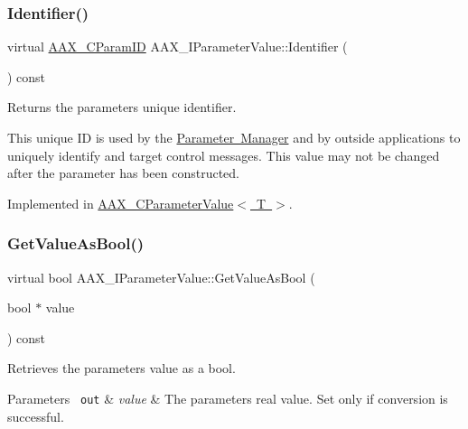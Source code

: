 \mbox{\label{a01853_a5de1e79f1f0e7024f6f473d923b5dda2}} 
\subsubsection{\texorpdfstring{Identifier()}{Identifier()}}
{\footnotesize\ttfamily virtual \mbox{\hyperlink{a00392_a1440c756fe5cb158b78193b2fc1780d1}{A\+A\+X\+\_\+\+C\+Param\+ID}} A\+A\+X\+\_\+\+I\+Parameter\+Value\+::\+Identifier (\begin{DoxyParamCaption}{ }\end{DoxyParamCaption}) const\hspace{0.3cm}{\ttfamily [pure virtual]}}



Returns the parameter\textquotesingle{}s unique identifier. 

This unique ID is used by the \mbox{\hyperlink{a00814}{Parameter Manager}} and by outside applications to uniquely identify and target control messages. This value may not be changed after the parameter has been constructed. 

Implemented in \mbox{\hyperlink{a01533_ac775643998370e9b70dfac23e8a542c6}{A\+A\+X\+\_\+\+C\+Parameter\+Value$<$ T $>$}}.

\mbox{\label{a01853_a5d792ea5770ace586d5de9e32f35773d}} 
\subsubsection{\texorpdfstring{GetValueAsBool()}{GetValueAsBool()}}
{\footnotesize\ttfamily virtual bool A\+A\+X\+\_\+\+I\+Parameter\+Value\+::\+Get\+Value\+As\+Bool (\begin{DoxyParamCaption}\item[{bool $\ast$}]{value }\end{DoxyParamCaption}) const\hspace{0.3cm}{\ttfamily [pure virtual]}}



Retrieves the parameter\textquotesingle{}s value as a bool. 


\begin{DoxyParams}[1]{Parameters}
\mbox{\texttt{ out}}  & {\em value} & The parameter\textquotesingle{}s real value. Set only if conversion is successful.\\
\hline
\end{DoxyParams}

